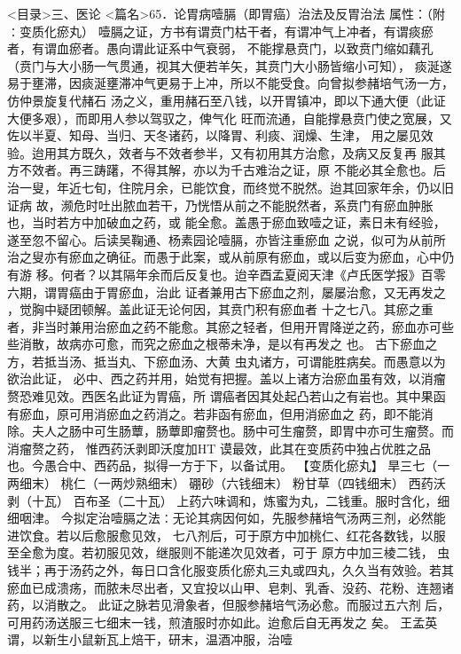 \documentclass[a4paper,12pt,UTF8,twoside]{ctexbook}
\begin{document}
<目录>三、医论
<篇名>65．论胃病噎膈（即胃癌）治法及反胃治法
属性：（附∶变质化瘀丸） 
噎膈之证，方书有谓贲门枯干者，有谓冲气上冲者，有谓痰瘀者，有谓血瘀者。愚向谓此证系中气衰弱， 
不能撑悬贲门，以致贲门缩如藕孔（贲门与大小肠一气贯通，视其大便若羊矢，其贲门大小肠皆缩小可知）， 
痰涎遂易于壅滞，因痰涎壅滞冲气更易于上冲，所以不能受食。向曾拟参赭培气汤一方，仿仲景旋复代赭石 
汤之义，重用赭石至八钱，以开胃镇冲，即以下通大便（此证大便多艰），而即用人参以驾驭之，俾气化 
旺而流通，自能撑悬贲门使之宽展，又佐以半夏、知母、当归、天冬诸药，以降胃、利痰、润燥、生津， 
用之屡见效验。迨用其方既久，效者与不效者参半，又有初用其方治愈，及病又反复再 
服其方不效者。再三踌躇，不得其解，亦以为千古难治之证，原 
不能必其全愈也。后治一叟，年近七旬，住院月余，已能饮食，而终觉不脱然。迨其回家年余，仍以旧证病 
故，濒危时吐出脓血若干，乃恍悟从前之不能脱然者，系贲门有瘀血肿胀也，当时若方中加破血之药，或 
能全愈。盖愚于瘀血致噎之证，素日未有经验，遂至忽不留心。后读吴鞠通、杨素园论噎膈，亦皆注重瘀血 
之说，似可为从前所治之叟亦有瘀血之确征。而愚于此案，或从前原有瘀血，或以后变为瘀血，心中仍有游 
移。何者？以其隔年余而后反复也。迨辛酉孟夏阅天津《卢氏医学报》百零六期，谓胃癌由于胃瘀血，治此 
证者兼用古下瘀血之剂，屡屡治愈，又无再发之 ，觉胸中疑团顿解。盖此证无论何因，其贲门积有瘀血者 
十之七八。其瘀之重者，非当时兼用治瘀血之药不能愈。其瘀之轻者，但用开胃降逆之药，瘀血亦可些 
些消散，故病亦可愈，而究之瘀血之根蒂未净，是以有再发之 也。 
古下瘀血之方，若抵当汤、抵当丸、下瘀血汤、大黄 虫丸诸方，可谓能胜病矣。而愚意以为欲治此证， 
必中、西之药并用，始觉有把握。盖以上诸方治瘀血虽有效，以消瘤赘恐难见效。西医名此证为胃癌，所 
谓癌者因其处起凸若山之有岩也。其中果函有瘀血，原可用消瘀血之药消之。若非函有瘀血，但用消瘀血之 
药，即不能消除。夫人之肠中可生肠蕈，肠蕈即瘤赘也。肠中可生瘤赘，即胃中亦可生瘤赘。而消瘤赘之药， 
惟西药沃剥即沃度加HT 谟最效，此其在变质药中独占优胜之品也。今愚合中、西药品，拟得一方于下，以备试用。 
【变质化瘀丸】 
旱三七（一两细末） 桃仁（一两炒熟细末） 硼砂（六钱细末） 粉甘草（四钱细末） 
西药沃剥（十瓦） 百布圣（二十瓦） 
上药六味调和，炼蜜为丸，二钱重。服时含化，细细咽津。 
今拟定治噎膈之法∶无论其病因何如，先服参赭培气汤两三剂，必然能进饮食。若以后愈服愈见效， 
七八剂后，可于原方中加桃仁、红花各数钱，以服至全愈为度。若初服见效，继服则不能递次见效者，可于 
原方中加三棱二钱， 虫钱半；再于汤药之外，每日口含化服变质化瘀丸三丸或四丸，久久当有效验。若其 
瘀血已成溃疡，而脓未尽出者，又宜投以山甲、皂刺、乳香、没药、花粉、连翘诸药，以消散之。 
此证之脉若见滑象者，但服参赭培气汤必愈。而服过五六剂 
后，可用药汤送服三七细末一钱，煎渣服时亦如此。迨愈后自无再发之 矣。 
王孟英谓，以新生小鼠新瓦上焙干，研末，温酒冲服，治噎 
\end{document}
